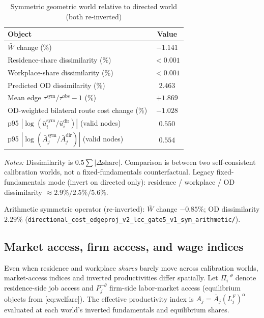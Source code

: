 \documentclass[12pt]{article}
\newcommand{\Wbar}{\bar W}
\newcommand{\ubar}{\bar u}
\newcommand{\Abar}{\bar A}
\newcommand{\obs}{\mathrm{obs}}
\newcommand{\sym}{\mathrm{sym}}
\newcommand{\dir}{\mathrm{dir}}
\begin{document}
\begin{table}[htbp]
  \centering
  \caption{Symmetric geometric world relative to directed world (both re-inverted)}
  \label{tab:main}
  \begin{tabular}{lc}
  \toprule
  Object & Value \\
  \midrule
  $\Wbar$ change (\%) & $-1.141$ \\
  Residence-share dissimilarity (\%) & $<0.001$ \\
  Workplace-share dissimilarity (\%) & $<0.001$ \\
  Predicted OD dissimilarity (\%) & $2.463$ \\
  Mean edge $\tau^{\sym}/\tau^{\obs}-1$ (\%) & $+1.869$ \\
  OD-weighted bilateral route cost change (\%) & $-1.028$ \\
  p95 $|\log(\ubar_i^{\sym}/\ubar_i^{\dir})|$ (valid nodes) & $0.550$ \\
  p95 $|\log(\Abar_j^{\sym}/\Abar_j^{\dir})|$ (valid nodes) & $0.554$ \\
  \bottomrule
  \end{tabular}
  \vspace{0.4em}

  \begin{minipage}{0.92\textwidth}
  \footnotesize
  \emph{Notes:} Dissimilarity is $0.5\sum|\Delta\text{share}|$.
  Comparison is between two self-consistent calibration worlds, not a fixed-fundamentals
  counterfactual. Legacy fixed-fundamentals mode (invert on directed only): residence /
  workplace / OD dissimilarity $\approx 2.9\% / 2.5\% / 5.6\%$.
  \end{minipage}
\end{table}

Arithmetic symmetric operator (re-inverted): $\Wbar$ change $-0.85\%$; OD dissimilarity
$2.29\%$ (\texttt{directional\_cost\_edgeproj\_v2\_lcc\_gate5\_v1\_sym\_arithmetic/}).

\subsection{Market access, firm access, and wage indices}\label{sec:ma_maps}

Even when residence and workplace \emph{shares} barely move across calibration worlds,
market-access indices and inverted productivities differ spatially.
Let $\Pi_i^{-\theta}$ denote residence-side job access and $P_j^{-\theta}$ firm-side
labor-market access (equilibrium objects from \eqref{eq:welfare}).
The effective productivity index is $A_j=\bar A_j(L_j^F)^{\alpha}$ evaluated at each
world's inverted fundamentals and equilibrium shares.
\end{document}

